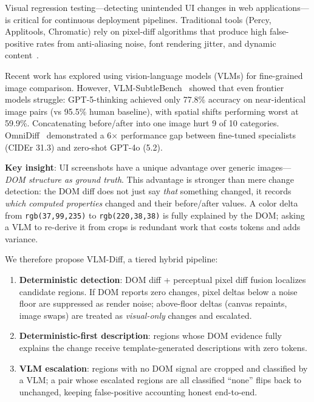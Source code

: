 \documentclass[10pt,twocolumn,letterpaper]{article}
\begin{document}
Visual regression testing—detecting unintended UI changes in web applications—is critical for continuous deployment pipelines. Traditional tools (Percy, Applitools, Chromatic) rely on pixel-diff algorithms that produce high false-positive rates from anti-aliasing noise, font rendering jitter, and dynamic content~\cite{applitools2026}.

Recent work has explored using vision-language models (VLMs) for fine-grained image comparison. However, VLM-SubtleBench~\cite{vlmsubtlebench2026} showed that even frontier models struggle: GPT-5-thinking achieved only 77.8\% accuracy on near-identical image pairs (vs 95.5\% human baseline), with spatial shifts performing worst at 59.9\%. Concatenating before/after into one image hurt 9 of 10 categories. OmniDiff~\cite{omnidiff2026} demonstrated a 6$\times$ performance gap between fine-tuned specialists (CIDEr 31.3) and zero-shot GPT-4o (5.2).

\textbf{Key insight}: UI screenshots have a unique advantage over generic images—\textit{DOM structure as ground truth}. This advantage is stronger than mere change detection: the DOM diff does not just say \textit{that} something changed, it records \textit{which computed properties} changed and their before/after values. A color delta from \texttt{rgb(37,99,235)} to \texttt{rgb(220,38,38)} is fully explained by the DOM; asking a VLM to re-derive it from crops is redundant work that costs tokens and adds variance.

We therefore propose VLM-Diff, a tiered hybrid pipeline:
\begin{enumerate}
\item \textbf{Deterministic detection}: DOM diff + perceptual pixel diff fusion localizes candidate regions. If DOM reports zero changes, pixel deltas below a noise floor are suppressed as render noise; above-floor deltas (canvas repaints, image swaps) are treated as \textit{visual-only} changes and escalated.
\item \textbf{Deterministic-first description}: regions whose DOM evidence fully explains the change receive template-generated descriptions with zero tokens.
\item \textbf{VLM escalation}: regions with no DOM signal are cropped and classified by a VLM; a pair whose escalated regions are all classified ``none'' flips back to unchanged, keeping false-positive accounting honest end-to-end.
\end{enumerate}
\end{document}
